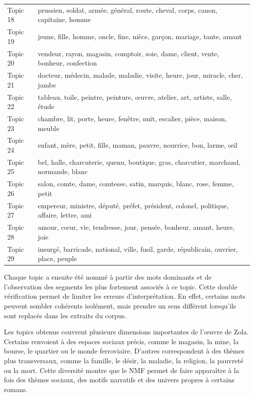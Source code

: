 \begin{longtable}{p{1.8cm}p{11.5cm}}
Topic 18 & prussien, soldat, armée, général, route, cheval, corps, canon, capitaine, homme \\
Topic 19 & jeune, fille, homme, oncle, fine, nièce, garçon, mariage, tante, amant \\
Topic 20 & vendeur, rayon, magasin, comptoir, soie, dame, client, vente, bonheur, confection \\
Topic 21 & docteur, médecin, malade, maladie, visite, heure, jour, miracle, cher, jambe \\
Topic 22 & tableau, toile, peintre, peinture, œuvre, atelier, art, artiste, salle, étude \\
Topic 23 & chambre, lit, porte, heure, fenêtre, nuit, escalier, pièce, maison, meuble \\
Topic 24 & enfant, mère, petit, fille, maman, pauvre, nourrice, bon, larme, œil \\
Topic 25 & bel, halle, charcuterie, quenu, boutique, gras, charcutier, marchand, normande, blanc \\
Topic 26 & salon, comte, dame, comtesse, satin, marquis, blanc, rose, femme, petit \\
Topic 27 & empereur, ministre, député, préfet, président, colonel, politique, affaire, lettre, ami \\
Topic 28 & amour, cœur, vie, tendresse, jour, pensée, bonheur, amant, heure, joie \\
Topic 29 & insurgé, barricade, national, ville, fusil, garde, républicain, ouvrier, place, peuple \\

\bottomrule
\end{longtable}

Chaque topic a ensuite été nommé à partir des mots dominants et de l'observation des segments les plus fortement associés à ce topic. Cette double vérification permet de limiter les erreurs d'interprétation. En effet, certains mots peuvent sembler cohérents isolément, mais prendre un sens différent lorsqu'ils sont replacés dans les extraits du corpus.

Les topics obtenus couvrent plusieurs dimensions importantes de l'œuvre de Zola. Certains renvoient à des espaces sociaux précis, comme le magasin, la mine, la bourse, le quartier ou le monde ferroviaire. D'autres correspondent à des thèmes plus transversaux, comme la famille, le désir, la maladie, la religion, la pauvreté ou la mort. Cette diversité montre que le NMF permet de faire apparaître à la fois des thèmes sociaux, des motifs narratifs et des univers propres à certains romans.


